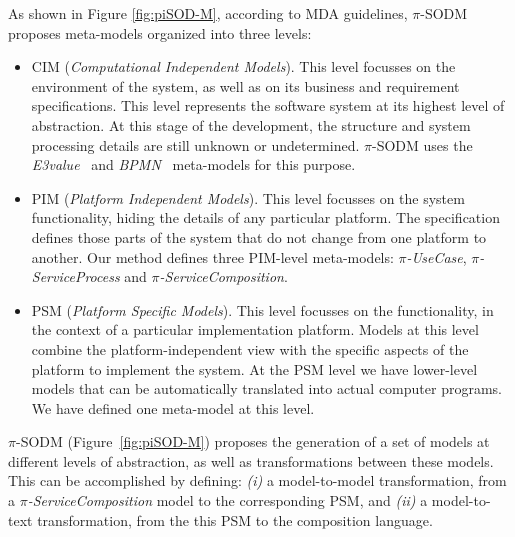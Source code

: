 As shown in Figure \ref{fig:piSOD-M}, according to MDA guidelines, $\pi$-SODM proposes meta-models  organized into three levels: 
\begin{itemize}
\item CIM (\textit{Computational Independent Models}). This level focusses on the
environment of the system, as well as on its business and requirement specifications.
This level represents the software system at its highest level of abstraction.
At this stage of the development, the structure and system processing details are still unknown or undetermined.  
$\pi$-SODM uses the \textit{E3value}~\cite{e3value} and \textit{BPMN}~\cite{BPMN} meta-models for this purpose. 

\item PIM (\textit{Platform Independent Models}). This level focusses on the system functionality, hiding the details of any particular platform.
The specification defines those parts of the system that do not change from one platform to another. 
Our method defines three PIM-level meta-models: \textit{$\pi$-UseCase}, \textit{$\pi$-ServiceProcess} and \textit{$\pi$-ServiceComposition}.
 
 \item PSM (\textit{Platform Specific Models}). This level focusses on the functionality, in the context of a particular implementation platform.
Models at this level combine the platform-independent view with the specific aspects of the platform to implement the system. At the PSM level we have lower-level models that can be automatically translated into actual computer programs. 
We have defined one meta-model at this level.
\end{itemize}


$\pi$-SODM (Figure~\ref{fig:piSOD-M}) proposes the generation of a set of models at different levels of abstraction, as well as transformations between these models.
This can be accomplished by defining: \textit{(i)} a model-to-model transformation, from a \textit{$\pi$-ServiceComposition} model to the corresponding PSM, and \textit{(ii)} a model-to-text transformation, from the this PSM to the composition language.

